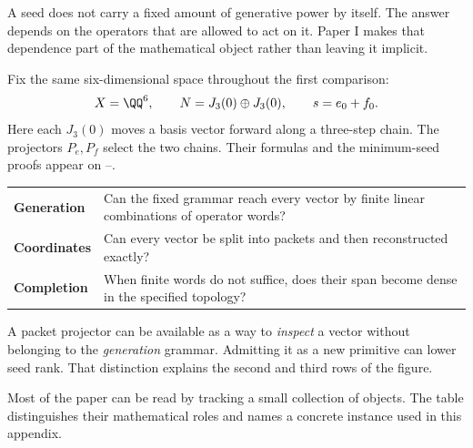 
A seed does not carry a fixed amount of generative power by itself. The answer depends on the operators that are allowed to act on it. Paper I makes that dependence part of the mathematical object rather than leaving it implicit.

Fix the same six-dimensional space throughout the first comparison:
\[
X=\QQ^6,\qquad N=J_3(0)\oplus J_3(0),\qquad
s=e_0+f_0.
\]
Here each $J_3(0)$ moves a basis vector forward along a three-step chain. The projectors $P_e,P_f$ select the two chains. Their formulas and the minimum-seed proofs appear on --.


\begin{tabularx}{\linewidth}{@{}p{.18\linewidth}Y@{}}
\textbf{Generation} & Can the fixed grammar reach every vector by finite linear combinations of operator words?\\[4pt]
\textbf{Coordinates} & Can every vector be split into packets and then reconstructed exactly?\\[4pt]
\textbf{Completion} & When finite words do not suffice, does their span become dense in the specified topology?
\end{tabularx}

A packet projector can be available as a way to \emph{inspect} a vector without belonging to the \emph{generation} grammar. Admitting it as a new primitive can lower seed rank. That distinction explains the second and third rows of the figure.


Most of the paper can be read by tracking a small collection of objects. The table distinguishes their mathematical roles and names a concrete instance used in this appendix.


